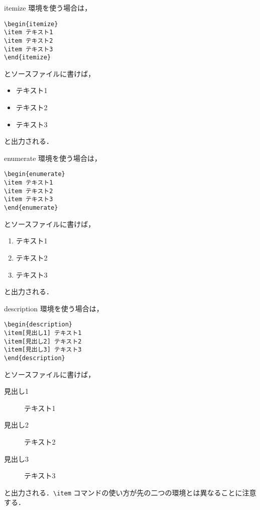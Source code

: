 itemize 環境を使う場合は，
\begin{screen}
\begin{verbatim}
\begin{itemize}
\item テキスト1
\item テキスト2
\item テキスト3
\end{itemize}
\end{verbatim}
\end{screen}
とソースファイルに書けば，
\begin{screen}
\begin{itemize}
\item テキスト1
\item テキスト2
\item テキスト3
\end{itemize}
\end{screen}
と出力される．

enumerate 環境を使う場合は，
\begin{screen}
\begin{verbatim}
\begin{enumerate}
\item テキスト1
\item テキスト2
\item テキスト3
\end{enumerate}
\end{verbatim}
\end{screen}
とソースファイルに書けば，
\begin{screen}
\begin{enumerate}
\item テキスト1
\item テキスト2
\item テキスト3
\end{enumerate}
\end{screen}
と出力される．

description 環境を使う場合は，
\begin{screen}
\begin{verbatim}
\begin{description}
\item[見出し1] テキスト1
\item[見出し2] テキスト2
\item[見出し3] テキスト3
\end{description}
\end{verbatim}
\end{screen}
とソースファイルに書けば，
\begin{screen}
\begin{description}
\item[見出し1] テキスト1
\item[見出し2] テキスト2
\item[見出し3] テキスト3
\end{description}
\end{screen}
と出力される．\verb|\item| コマンドの使い方が先の二つの環境とは異なることに注意する．

